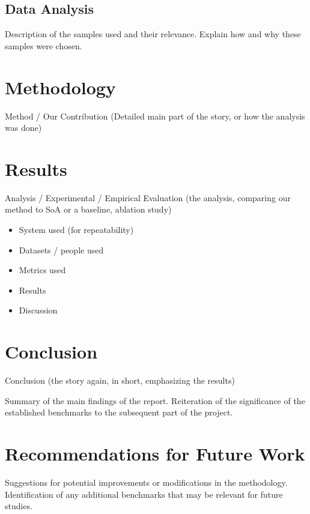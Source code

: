 \subsection{Data Analysis}
Description of the samples used and their relevance.
Explain how and why these samples were chosen.

\section{Methodology}
Method / Our Contribution (Detailed main part of the story, or how the analysis was done)

\section{Results}
Analysis / Experimental / Empirical Evaluation (the analysis, comparing our method to SoA or a baseline, ablation study)
\begin{itemize}
    \item System used (for repeatability)
    \item Datasets / people used
    \item Metrics used
    \item Results
    \item Discussion
\end{itemize}

\section{Conclusion}
Conclusion (the story again, in short, emphasizing the results)

Summary of the main findings of the report.
Reiteration of the significance of the established benchmarks to the subsequent part of the project.

\section{Recommendations for Future Work}
Suggestions for potential improvements or modifications in the methodology.
Identification of any additional benchmarks that may be relevant for future studies.
